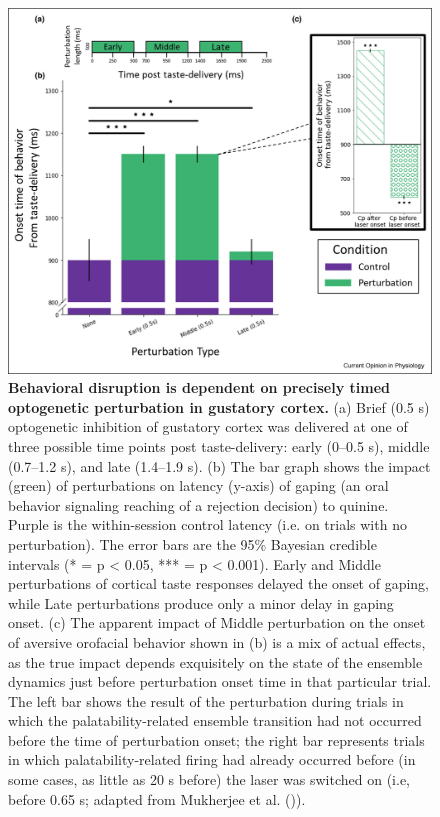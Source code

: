 \begin{refsection}
\begin{figure}
\includegraphics[width=\linewidth]{lin_2021_review_figs/1-s2.0-S2468867320301693-gr3_lrg.jpg}
\caption{\textbf{Behavioral disruption is dependent on precisely timed optogenetic perturbation in gustatory cortex.} (a) Brief (0.5 s) optogenetic inhibition of gustatory cortex was delivered at one of three possible time points post taste-delivery: early (0–0.5 s), middle (0.7–1.2 s), and late (1.4–1.9 s). (b) The bar graph shows the impact (green) of perturbations on latency (y-axis) of gaping (an oral behavior signaling reaching of a rejection decision) to quinine. Purple is the within-session control latency (i.e. on trials with no perturbation). The error bars are the 95\% Bayesian credible intervals (* = p < 0.05, *** = p < 0.001). Early and Middle perturbations of cortical taste responses delayed the onset of gaping, while Late perturbations produce only a minor delay in gaping onset. (c) The apparent impact of Middle perturbation on the onset of aversive orofacial behavior shown in (b) is a mix of actual effects, as the true impact depends exquisitely on the state of the ensemble dynamics just before perturbation onset time in that particular trial. The left bar shows the result of the perturbation during trials in which the palatability-related ensemble transition had not occurred before the time of perturbation onset; the right bar represents trials in which palatability-related firing had already occurred before (in some cases, as little as 20 s before) the laser was switched on (i.e, before 0.65 s; adapted from Mukherjee et al. (\cite{mukherjee2019a})).}
\label{fig:wrapfig}
\end{figure}


\end{refsection}
